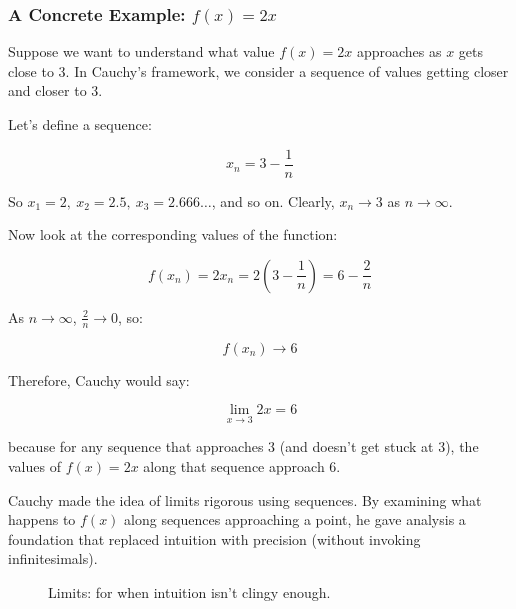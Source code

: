 \subsubsection{A Concrete Example: \( f(x) = 2x \)}

Suppose we want to understand what value \( f(x) = 2x \) approaches as \( x \) gets close to 3. In Cauchy’s framework, we consider a sequence of values getting closer and closer to 3.

Let’s define a sequence:

\[
x_n = 3 - \frac{1}{n}
\]

So \( x_1 = 2,\ x_2 = 2.5,\ x_3 = 2.666\dots \), and so on. Clearly, \( x_n \to 3 \) as \( n \to \infty \).

Now look at the corresponding values of the function:

\[
f(x_n) = 2x_n = 2 \left( 3 - \frac{1}{n} \right) = 6 - \frac{2}{n}
\]

As \( n \to \infty \), \( \frac{2}{n} \to 0 \), so:

\[
f(x_n) \to 6
\]

Therefore, Cauchy would say:

\[
\lim_{x \to 3} 2x = 6
\]

because for any sequence that approaches 3 (and doesn’t get stuck at 3), the values of \( f(x) = 2x \) along that sequence approach 6.


Cauchy made the idea of limits rigorous using sequences. By examining what happens to \( f(x) \) along sequences approaching a point, he gave analysis a foundation that replaced intuition with precision (without invoking infinitesimals).

\begin{figure}[H]
\centering
{}
\caption{Limits: for when intuition isn't clingy enough.}
\end{figure}






